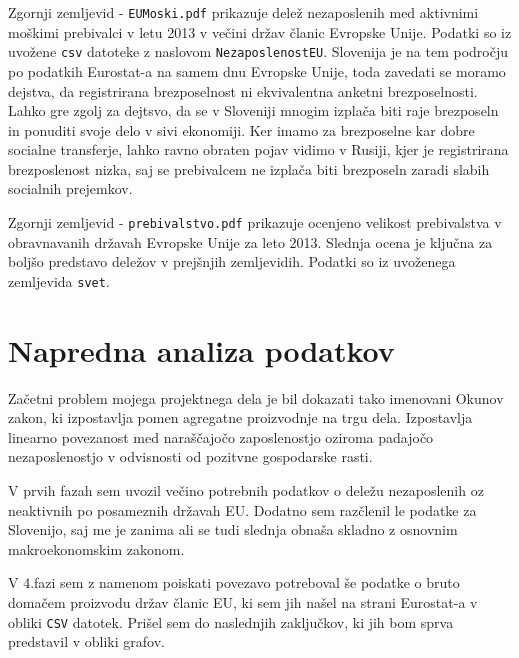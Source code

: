 \documentclass[11pt,a4paper]{article}
\begin{document}
Zgornji zemljevid - \verb|EUMoski.pdf| prikazuje delež nezaposlenih med aktivnimi moškimi prebivalci v letu 2013 v večini držav članic Evropske Unije. Podatki so iz uvožene \verb|csv| datoteke z naslovom \verb|NezaposlenostEU|. Slovenija je na tem področju po podatkih Eurostat-a na samem dnu Evropske Unije, toda zavedati se moramo dejstva, da registrirana brezposelnost ni ekvivalentna anketni brezposelnosti. Lahko gre zgolj za dejtsvo, da se v Sloveniji mnogim izplača biti raje brezposeln in ponuditi svoje delo v sivi ekonomiji. Ker imamo za brezposelne kar dobre socialne transferje, lahko ravno obraten pojav vidimo v Rusiji, kjer je registrirana brezposlenost nizka, saj se prebivalcem ne izplača biti brezposeln zaradi slabih socialnih prejemkov.


Zgornji zemljevid - \verb|prebivalstvo.pdf| prikazuje ocenjeno velikost prebivalstva v obravnavanih državah Evropske Unije za leto 2013. Slednja ocena je ključna za boljšo predstavo deležov v prejšnjih zemljevidih. Podatki so iz uvoženega zemljevida \verb|svet|. 

\pagebreak
\section{Napredna analiza podatkov}

Začetni problem mojega projektnega dela je bil dokazati tako imenovani Okunov zakon, ki izpostavlja pomen agregatne proizvodnje na trgu dela. Izpostavlja linearno povezanost med naraščajočo zaposlenostjo oziroma padajočo nezaposlenostjo v odvisnosti od pozitvne gospodarske rasti. 

V prvih fazah sem uvozil večino potrebnih podatkov o deležu nezaposlenih oz neaktivnih po posameznih državah EU. Dodatno sem razčlenil le podatke za Slovenijo, saj me je zanima ali se tudi slednja obnaša skladno z osnovnim makroekonomskim zakonom.

V 4.fazi sem z namenom poiskati povezavo potreboval še podatke o bruto domačem proizvodu držav članic EU, ki sem jih našel na strani Eurostat-a v obliki \verb|CSV| datotek. Prišel sem do naslednjih zaključkov, ki jih bom sprva predstavil v obliki grafov.
\end{document}
